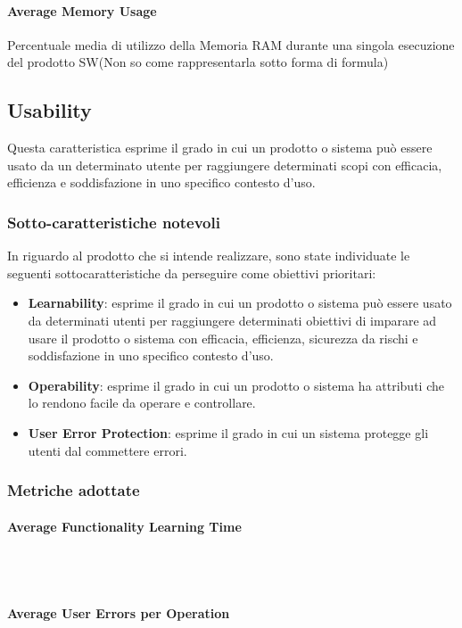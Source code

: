 \paragraph{Average Memory Usage}
\begin{flushleft}
Percentuale media di utilizzo della Memoria RAM durante una singola esecuzione del prodotto SW(Non so come rappresentarla sotto forma di formula)
\end{flushleft}

\subsection{Usability}
Questa caratteristica esprime il grado in cui un prodotto o sistema può essere usato da un determinato utente per raggiungere determinati scopi con efficacia, efficienza e soddisfazione in uno specifico contesto d'uso.
\subsubsection{Sotto-caratteristiche notevoli}
In riguardo al prodotto che si intende realizzare, sono state individuate le seguenti sottocaratteristiche da perseguire come obiettivi prioritari:
\begin{itemize}
	\item{\textbf{Learnability}}: esprime il grado in cui un prodotto o sistema può essere usato da determinati utenti per raggiungere determinati obiettivi di imparare ad usare il prodotto o sistema  con efficacia, efficienza, sicurezza da rischi e soddisfazione in uno specifico contesto d'uso.
	\item{\textbf{Operability}}: esprime il grado in cui un prodotto o sistema ha attributi che lo rendono facile da operare e controllare.
	\item{\textbf{User Error Protection}}: esprime il grado in cui un sistema protegge gli utenti dal commettere errori.
\end{itemize}
\subsubsection{Metriche adottate}
\paragraph{Average Functionality Learning Time}  ~\\ ~\\

\paragraph{Average User Errors per Operation}  ~\\ ~\\

